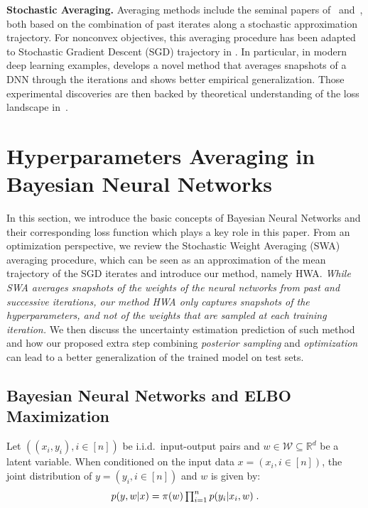 \documentclass[tablecaption=bottom,wcp]{jmlr} %
\begin{document}
\vspace{0.08in}
\noindent \textbf{Stochastic Averaging.}
Averaging methods include the seminal papers of~\citep{polyak1990sa} and~\citep{ruppert1988efficient}, both based on the combination of past iterates along a stochastic approximation trajectory.
For nonconvex objectives, this averaging procedure has been adapted to Stochastic Gradient Descent (SGD) trajectory in \citep{zhou2017convergence}.
In particular, in modern deep learning examples, \citet{izmailov2018averaging} develops a novel method that averages snapshots of a DNN through the iterations and shows better empirical generalization.
Those experimental discoveries are then backed by theoretical understanding of the loss landscape in~\citep{keskar2016large,he2019asymmetric}.


\section{Hyperparameters Averaging in Bayesian Neural Networks}\label{sec:main}

In this section, we introduce the basic concepts of Bayesian Neural Networks and their corresponding loss function which plays a key role in this paper.
From an optimization perspective, we review the Stochastic Weight Averaging (SWA)~\citep{izmailov2018averaging} averaging procedure, which can be seen as an approximation of the mean trajectory of the SGD iterates and introduce our method, namely HWA.
\textit{While SWA averages snapshots of the weights of the neural networks from past and successive iterations, our method HWA only captures snapshots of the hyperparameters, and not of the weights that are sampled at each training iteration.}
We then discuss the uncertainty estimation prediction of such method and how our proposed extra step combining \emph{posterior sampling} and \emph{optimization} can lead to a better generalization of the trained model on test sets.

\subsection{Bayesian Neural Networks and ELBO Maximization}
Let $((x_i,y_i),  i \in [n])$ be i.i.d.~input-output pairs and $w \in \mathcal{W} \subseteq \mathbb{R}^{d}$ be a latent variable. When conditioned on the input data $x = (x_i, i \in [n])$, the joint distribution of $y = (y_i, i \in [n])$ and $w$ is given by:
\begin{equation}\label{eq:vi} \textstyle
    p(y,w | x) = \prior(w)\prod_{i=1}^{n}{p(y_i | x_i, w)} \eqsp.
\end{equation}
\end{document}
